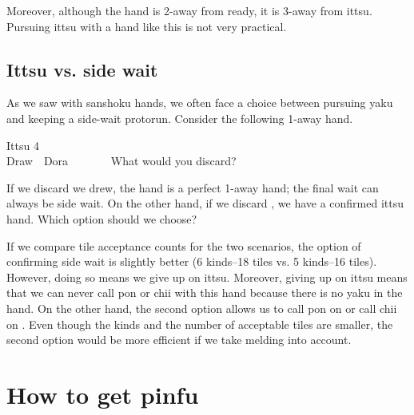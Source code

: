 \bigskip
Moreover, although the hand is 2-away from ready, it is 3-away from {\jap ittsu}. Pursuing {\jap ittsu} with a hand like this is not very practical.

\bigskip
\subsection{{\jap Ittsu} vs. side wait}
As we saw with {\jap sanshoku} hands, we often face a choice between pursuing {\jap yaku} and keeping a side-wait protorun. Consider the following 1-away hand. 

\begin{itembox}[r]{{\jap Ittsu} 4}
\bp
{}~~\\
\hfill\footnotesize{Draw~~{\jap Dora}~~~~~~~}
\ep {}
\vspace{-15pt}What would you discard? \vspace{-5pt}
\end{itembox}
\noindent
If we discard {\LARGE{}} we drew, the hand is a perfect 1-away hand; the final wait can always be side wait. On the other hand, if we discard {\LARGE{}}, we have a confirmed {\jap ittsu} hand. Which option should we choose?

\bigskip
If we compare tile acceptance counts for the two scenarios, the option of confirming side wait is slightly better (6 kinds--18 tiles vs. 5 kinds--16 tiles). However, doing so means we give up on {\jap ittsu}. Moreover, giving up on {\jap ittsu} means that we can never call {\jap pon} or {\jap chii} with this hand because there is no {\jap yaku} in the hand. On the other hand, the second option allows us to call {\jap pon} on {\LARGE{}} or call {\jap chii} on {\LARGE{}}. 
Even though the kinds and the number of acceptable tiles are smaller, the second option would be more efficient if we take melding into account. 

\newpage
\section{How to get {\jap pinfu}} \label{sec:pinfu}


